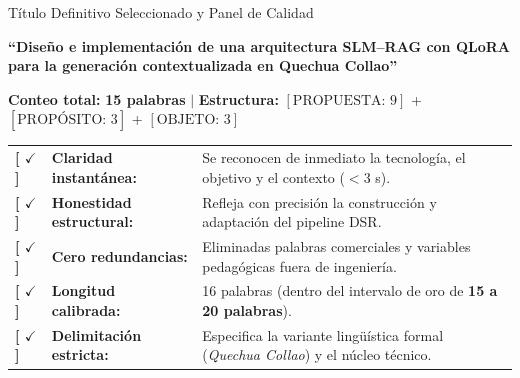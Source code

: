 \documentclass[aspectratio=169, 10pt, spanish]{beamer}
\begin{document}
\begin{frame}{Título Definitivo Seleccionado y Panel de Calidad}
    \vspace{-0.3cm}
    \begin{tcolorbox}[enhanced, colback=white, colframe=bpNavy, title=\textbf{Título Estructural Seleccionado (Especificación Técnica)}, arc=2mm, left=2mm, right=2mm, top=1.5mm, bottom=1.5mm]
        \centering\normalsize\bfseries\sffamily
        \color{bpBlue}``Diseño e implementación de una arquitectura SLM--RAG con QLoRA\\ \color{bpGold!90!black}para la generación contextualizada \color{bpRust}en Quechua Collao''
        
        \vspace{0.1cm}
        \scriptsize\normalfont\color{bpNavy!80!black}
        \textbf{Conteo total:} \textbf{15 palabras} $\mid$ \textbf{Estructura:} $[\text{PROPUESTA: 9}]$ + $[\text{PROPÓSITO: 3}]$ + $[\text{OBJETO: 3}]$
    \end{tcolorbox}

    \vspace{0.15cm}
    \begin{tcolorbox}[enhanced, colback=bpLightGray, colframe=bpGreen!70!black, title=\textbf{Panel de Control de Calidad y Auditoría Final (100\% Aprobado)}, arc=1.5mm, left=2mm, right=2mm, top=1.5mm, bottom=1.5mm]
        \tiny
        \begin{tabular}{lll}
            \color{bpGreen}\bfseries [ $\checkmark$ ] & \textbf{Claridad instantánea:} & Se reconocen de inmediato la tecnología, el objetivo y el contexto ($< 3$ s). \\
            \color{bpGreen}\bfseries [ $\checkmark$ ] & \textbf{Honestidad estructural:} & Refleja con precisión la construcción y adaptación del pipeline DSR. \\
            \color{bpGreen}\bfseries [ $\checkmark$ ] & \textbf{Cero redundancias:} & Eliminadas palabras comerciales y variables pedagógicas fuera de ingeniería. \\
            \color{bpGreen}\bfseries [ $\checkmark$ ] & \textbf{Longitud calibrada:} & 16 palabras (dentro del intervalo de oro de \textbf{15 a 20 palabras}). \\
            \color{bpGreen}\bfseries [ $\checkmark$ ] & \textbf{Delimitación estricta:} & Especifica la variante lingüística formal (\textit{Quechua Collao}) y el núcleo técnico. \\
        \end{tabular}
    \end{tcolorbox}
\end{frame}
\end{document}

